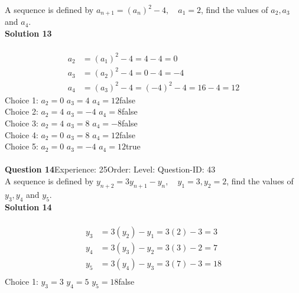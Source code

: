 \documentclass{article}
\begin{document}
A sequence is defined by $a_{n+1}=(a_n)^2-4, \quad a_1=2$, find the values of $a_2,a_3$ and $a_4$.\\[4pt]
\noindent\textbf{Solution 13}\\[2pt]
\\[-35pt]\begin{align*}
a_2&=(a_1)^2-4=4-4=0\\[2pt]
a_3&=(a_2)^2-4=0-4=-4\\[2pt]
a_4&=(a_3)^2-4=(-4)^2-4=16-4=12
\end{align*}
Choice 1: \hspace{20pt}$a_2=0 \,\, a_3=4 \,\, a_4=12 $\hspace{20pt}false\\
Choice 2: \hspace{20pt}$a_2=4 \,\, a_3=-4 \,\, a_4=8 $\hspace{20pt}false\\
Choice 3: \hspace{20pt}$a_2=4 \,\, a_3=8 \,\, a_4=-8 $\hspace{20pt}false\\
Choice 4: \hspace{20pt}$a_2=0 \,\, a_3=8 \,\, a_4=12 $\hspace{20pt}false\\
Choice 5: \hspace{20pt}$a_2=0 \,\, a_3=-4 \,\, a_4=12 $\hspace{20pt}true\\
\\[4pt]
\noindent\textbf{Question 14}\hspace{20pt}Experience: 25\hspace{20pt}Order: \hspace{20pt}Level: \hspace{20pt}Question-ID: 43\\[2pt]
A sequence is defined by $y_{n+2}=3y_{n+1}-y_n, \quad y_1=3,y_2=2$, find the values of $y_3,y_4$ and $y_5$.\\[4pt]
\noindent\textbf{Solution 14}\\[2pt]
\\[-35pt]\begin{align*}
y_3&=3(y_2)-y_1=3(2)-3=3\\[2pt]
y_4&=3(y_3)-y_2=3(3)-2=7\\[2pt]
y_5&=3(y_4)-y_3=3(7)-3=18\\[-30pt]
\end{align*}
Choice 1: \hspace{20pt}$y_3=3 \,\, y_4=5 \,\, y_5=18 $\hspace{20pt}false\\
\end{document}
